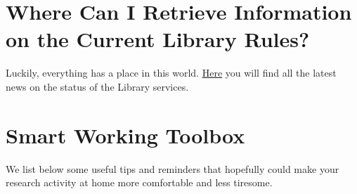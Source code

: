\documentclass{sissavademecum}
\begin{document}
\section{Where Can I Retrieve Information on the Current Library Rules?}

Luckily, everything has a place in this world. \href{https://library.sissa.it/new-library-timetable-rules}{Here} you will find all the latest news on the status of the Library services.


\section{Smart Working Toolbox}

We list below some useful tips and reminders that hopefully could make your research activity at home more comfortable and less tiresome.
\end{document}
